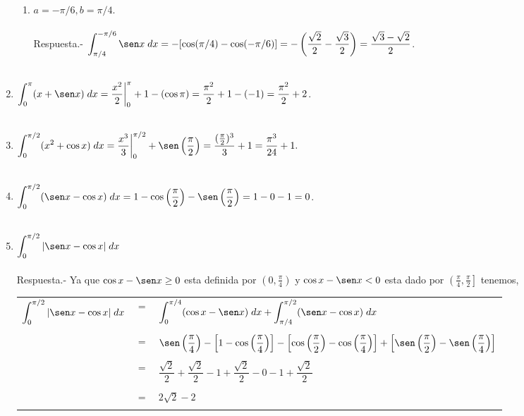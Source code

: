 \begin{enumerate}[\bfseries 1.]
\begin{enumerate}[\bfseries (a)]
	\item $a=-\pi/6,b=\pi/4$.\\\\
	    Respuesta.-\; $\displaystyle\int_{\pi/4}^{-\pi/6}\sen x \; dx = -[\cos(\pi/4) - \cos(-\pi/6)] = -\left(\dfrac{\sqrt{2}}{2}-\dfrac{\sqrt{3}}{2}\right) = \dfrac{\sqrt{3}-\sqrt{2}}{2}$.\\\\

    \end{enumerate}

\item $\displaystyle\int_{0}^\pi (x+\sen x)\; dx = \dfrac{x^2}{2}\bigg|_0^\pi + 1 - (\cos \pi) = \dfrac{\pi^2}{2}+1-(-1) = \dfrac{\pi^2}{2} + 2$.\\\\

\item $\displaystyle\int_{0}^{\pi/2} (x^2+\cos x)\; dx = \dfrac{x^3}{3}\bigg|_0^{\pi/2}+\sen\left(\dfrac{\pi}{2}\right) = \dfrac{(\frac{\pi}{2})^3}{3} + 1 = \dfrac{\pi^3}{24}+1.$\\\\

\item $\displaystyle\int_0^{\pi/2} (\sen x - \cos x)\; dx = 1-\cos \left(\dfrac{\pi}{2}\right) - \sen\left(\dfrac{\pi}{2}\right) = 1-0-1 = 0$.\\\\

\item $\displaystyle\int_0^{\pi/2} |\sen x - \cos x|\; dx$\\\\
    Respuesta.-\; Ya que $\cos x - \sen x \geq 0$ esta definida por $\left(0,\frac{\pi}{4}\right)$ y $\cos x - \sen x < 0$ esta dado por $\left(\frac{\pi}{4},\frac{\pi}{2}\right]$ tenemos,
    \begin{center}
	\begin{tabular}{rcl}
	    $\displaystyle\int_0^{\pi/2} |\sen x - \cos x|\; dx$&$=$&$\displaystyle\int_0^{\pi/4}(\cos x - \sen x)\; dx + \int_{\pi/4}^{\pi/2}(\sen x - \cos x)\; dx$\\\\
								&$=$&$\sen\left(\dfrac{\pi}{4}\right)-\left[1-\cos\left(\dfrac{\pi}{4}\right)\right]  -\left[\cos\left(\dfrac{\pi}{2}\right)-\cos\left(\dfrac{\pi}{4}\right)\right]+\left[\sen\left(\dfrac{\pi}{2}\right)-\sen \left(\dfrac{\pi}{4}\right)\right]$\\\\
								&$=$&$\dfrac{\sqrt{2}}{2}+\dfrac{\sqrt{2}}{2}-1+\dfrac{\sqrt{2}}{2}-0-1+\dfrac{\sqrt{2}}{2}$\\\\
	      &$=$&$2\sqrt{2}-2$\\\\
	  \end{tabular}
    \end{center}


\end{enumerate}
